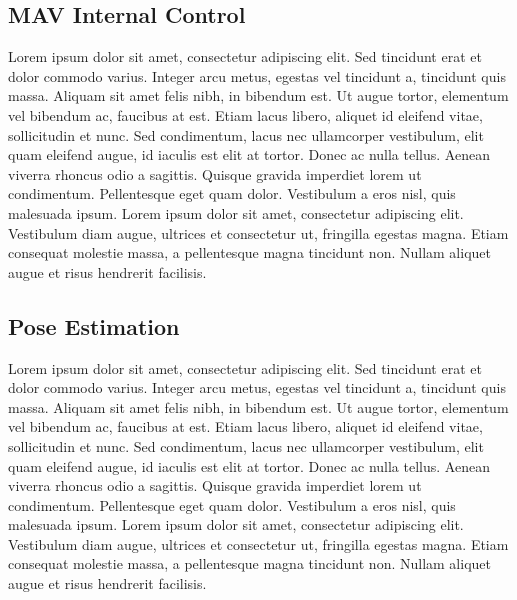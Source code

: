 \documentclass[letterpaper, 10 pt, conference]{ieeeconf}
\begin{document}
\subsection{MAV Internal Control}
Lorem ipsum dolor sit amet, consectetur adipiscing elit. Sed tincidunt erat et dolor commodo varius. Integer arcu metus, egestas vel tincidunt a, tincidunt quis massa. Aliquam sit amet felis nibh, in bibendum est. Ut augue tortor, elementum vel bibendum ac, faucibus at est. Etiam lacus libero, aliquet id eleifend vitae, sollicitudin et nunc. Sed condimentum, lacus nec ullamcorper vestibulum, elit quam eleifend augue, id iaculis est elit at tortor. Donec ac nulla tellus. Aenean viverra rhoncus odio a sagittis. Quisque gravida imperdiet lorem ut condimentum. Pellentesque eget quam dolor. Vestibulum a eros nisl, quis malesuada ipsum. Lorem ipsum dolor sit amet, consectetur adipiscing elit. Vestibulum diam augue, ultrices et consectetur ut, fringilla egestas magna. Etiam consequat molestie massa, a pellentesque magna tincidunt non. Nullam aliquet augue et risus hendrerit facilisis.

\subsection{Pose Estimation}
Lorem ipsum dolor sit amet, consectetur adipiscing elit. Sed tincidunt erat et dolor commodo varius. Integer arcu metus, egestas vel tincidunt a, tincidunt quis massa. Aliquam sit amet felis nibh, in bibendum est. Ut augue tortor, elementum vel bibendum ac, faucibus at est. Etiam lacus libero, aliquet id eleifend vitae, sollicitudin et nunc. Sed condimentum, lacus nec ullamcorper vestibulum, elit quam eleifend augue, id iaculis est elit at tortor. Donec ac nulla tellus. Aenean viverra rhoncus odio a sagittis. Quisque gravida imperdiet lorem ut condimentum. Pellentesque eget quam dolor. Vestibulum a eros nisl, quis malesuada ipsum. Lorem ipsum dolor sit amet, consectetur adipiscing elit. Vestibulum diam augue, ultrices et consectetur ut, fringilla egestas magna. Etiam consequat molestie massa, a pellentesque magna tincidunt non. Nullam aliquet augue et risus hendrerit facilisis.

\end{document}
